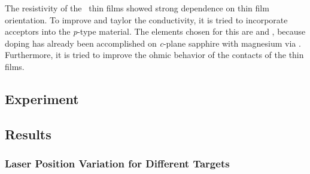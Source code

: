 The resistivity of the \cro\ thin films showed strong dependence on thin film orientation.
To improve and taylor the conductivity, it is tried to incorporate acceptors into the \textit{p}-type material.
The elements chosen for this are  and , because doping has already been accomplished on \textit{c}-plane sapphire with magnesium via 
    \cite{farrell2015}.
Furthermore, it is tried to improve the ohmic behavior of the contacts of the thin films.

\subsection{Experiment}
    
\subsection{Results}
    \subsubsection{Laser Position Variation for Different Targets}
        